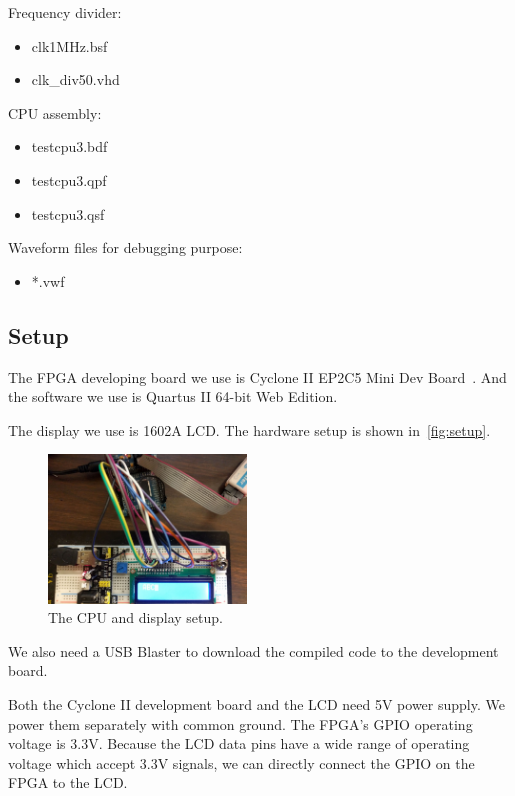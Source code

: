 Frequency divider:
\begin{itemize}
	\item clk1MHz.bsf
	\item clk\_div50.vhd
\end{itemize}


CPU assembly:
\begin{itemize}
	\item testcpu3.bdf
	\item testcpu3.qpf
	\item testcpu3.qsf
\end{itemize}

Waveform files for debugging purpose:
\begin{itemize}
	\item *.vwf
\end{itemize}


\subsection{Setup}
The FPGA developing board we use is Cyclone II EP2C5 Mini Dev Board~\cite{cyclone2}. And the software we use is Quartus II 64-bit Web Edition.

The display we use is 1602A LCD. The hardware setup is shown in~\autoref{fig:setup}.


\begin{figure}[th]
	\includegraphics[width=0.47\textwidth]{figures/setup}
	\centering
	\caption{The CPU and display setup.}
	\label{fig:setup}
\end{figure}

We also need a USB Blaster to download the compiled code to the development board.

Both the Cyclone II development board and the LCD need 5V power supply. We power them separately with common ground. The FPGA's GPIO operating voltage is 3.3V. Because the LCD data pins have a wide range of operating voltage which accept 3.3V signals, we can directly connect the GPIO on the FPGA to the LCD. 
